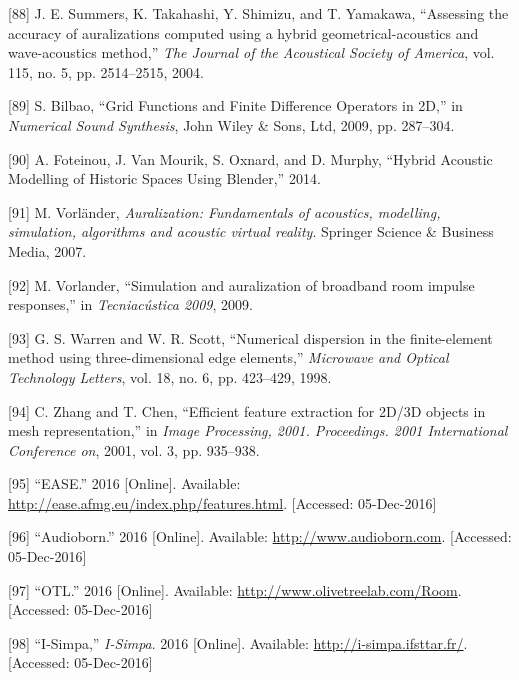 \documentclass[]{scrreprt}
\begin{document}
\hypertarget{ref-summersux5fassessingux5f2004}{}
{[}88{]} J. E. Summers, K. Takahashi, Y. Shimizu, and T. Yamakawa,
``Assessing the accuracy of auralizations computed using a hybrid
geometrical-acoustics and wave-acoustics method,'' \emph{The Journal of
the Acoustical Society of America}, vol. 115, no. 5, pp. 2514--2515,
2004.

\hypertarget{ref-bilbaoux5fgridux5f2009}{}
{[}89{]} S. Bilbao, ``Grid Functions and Finite Difference Operators in
2D,'' in \emph{Numerical Sound Synthesis}, John Wiley \& Sons, Ltd,
2009, pp. 287--304.

\hypertarget{ref-foteinouux5fhybridux5f2014}{}
{[}90{]} A. Foteinou, J. Van Mourik, S. Oxnard, and D. Murphy, ``Hybrid
Acoustic Modelling of Historic Spaces Using Blender,'' 2014.

\hypertarget{ref-vorlanderux5fauralization:ux5f2007}{}
{[}91{]} M. Vorländer, \emph{Auralization: Fundamentals of acoustics,
modelling, simulation, algorithms and acoustic virtual reality}.
Springer Science \& Business Media, 2007.

\hypertarget{ref-vorlanderux5fsimulationux5f2009}{}
{[}92{]} M. Vorlander, ``Simulation and auralization of broadband room
impulse responses,'' in \emph{Tecniacústica 2009}, 2009.

\hypertarget{ref-warrenux5fnumericalux5f1998}{}
{[}93{]} G. S. Warren and W. R. Scott, ``Numerical dispersion in the
finite-element method using three-dimensional edge elements,''
\emph{Microwave and Optical Technology Letters}, vol. 18, no. 6, pp.
423--429, 1998.

\hypertarget{ref-zhangux5fefficientux5f2001}{}
{[}94{]} C. Zhang and T. Chen, ``Efficient feature extraction for 2D/3D
objects in mesh representation,'' in \emph{Image Processing, 2001.
Proceedings. 2001 International Conference on}, 2001, vol. 3, pp.
935--938.

\hypertarget{ref-ux5feaseux5f2016}{}
{[}95{]} ``EASE.'' 2016 {[}Online{]}. Available:
\url{http://ease.afmg.eu/index.php/features.html}. {[}Accessed:
05-Dec-2016{]}

\hypertarget{ref-ux5faudiobornux5f2016}{}
{[}96{]} ``Audioborn.'' 2016 {[}Online{]}. Available:
\url{http://www.audioborn.com}. {[}Accessed: 05-Dec-2016{]}

\hypertarget{ref-ux5fotlux5f2016}{}
{[}97{]} ``OTL.'' 2016 {[}Online{]}. Available:
\url{http://www.olivetreelab.com/Room}. {[}Accessed: 05-Dec-2016{]}

\hypertarget{ref-ux5fi-simpaux5f2016}{}
{[}98{]} ``I-Simpa,'' \emph{I-Simpa}. 2016 {[}Online{]}. Available:
\url{http://i-simpa.ifsttar.fr/}. {[}Accessed: 05-Dec-2016{]}
\end{document}

